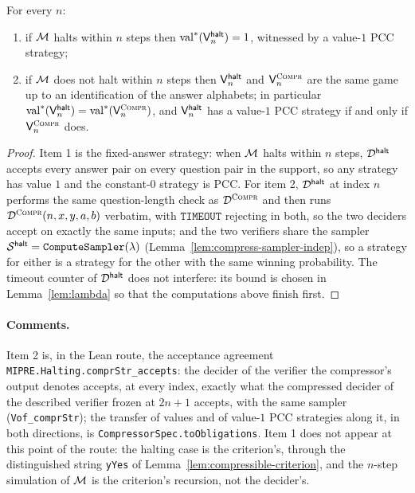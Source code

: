\begin{lemma}
\label{lem:dhalt-values}
\leanok
For every $n$:
\begin{enumerate}
\item if $\mathcal{M}$ halts within $n$ steps then $\mathrm{val}^*(\mathsf{V}^{\mathsf{halt}}_n) = 1$, witnessed by a
  value-$1$ PCC strategy;
\item if $\mathcal{M}$ does not halt within $n$ steps then $\mathsf{V}^{\mathsf{halt}}_n$ and $\mathsf{V}^{\textsc{Compr}}_n$ are the
  same game up to an identification of the answer alphabets; in particular
  $\mathrm{val}^*(\mathsf{V}^{\mathsf{halt}}_n) = \mathrm{val}^*(\mathsf{V}^{\textsc{Compr}}_n)$, and $\mathsf{V}^{\mathsf{halt}}_n$ has a value-$1$ PCC strategy
  if and only if $\mathsf{V}^{\textsc{Compr}}_n$ does.
\end{enumerate}
\end{lemma}
\begin{proof}
\leanok
Item 1 is the fixed-answer strategy: when $\mathcal{M}$ halts within $n$ steps, $\mathcal{D}^{\mathsf{halt}}$
accepts every answer pair on every question pair in the support, so any strategy has value
$1$ and the constant-$0$ strategy is PCC. For item 2, $\mathcal{D}^{\mathsf{halt}}$ at index $n$ performs the
same question-length check as $\mathcal{D}^{\textsc{Compr}}$ and then runs $\mathcal{D}^{\textsc{Compr}}(n, x, y, a, b)$ verbatim,
with $\mathtt{TIMEOUT}$ rejecting in both, so the two deciders accept on exactly the same
inputs; and the two verifiers share the sampler $\mathcal{S}^{\mathsf{halt}} = \mathtt{ComputeSampler}(\lambda)$
(Lemma~\ref{lem:compress-sampler-indep}), so a strategy for either is a strategy for the
other with the same winning probability. The timeout counter of $\mathcal{D}^{\mathsf{halt}}$ does not
interfere: its bound is chosen in Lemma~\ref{lem:lambda} so that the computations above
finish first.
\end{proof}

\paragraph{Comments.} Item 2 is, in the Lean route, the acceptance agreement
\texttt{MIPRE.Halting.comprStr\_accepts}: the decider of the verifier the compressor's output
denotes accepts, at every index, exactly what the compressed decider of the described
verifier frozen at $2n + 1$ accepts, with the same sampler (\texttt{Vof\_comprStr}); the
transfer of values and of value-$1$ PCC strategies along it, in both directions, is
\texttt{CompressorSpec.toObligations}. Item 1 does not appear at this point of the route: the
halting case is the criterion's, through the distinguished string \texttt{yYes} of
Lemma~\ref{lem:compressible-criterion}, and the $n$-step simulation of $\mathcal{M}$ is the
criterion's recursion, not the decider's.

